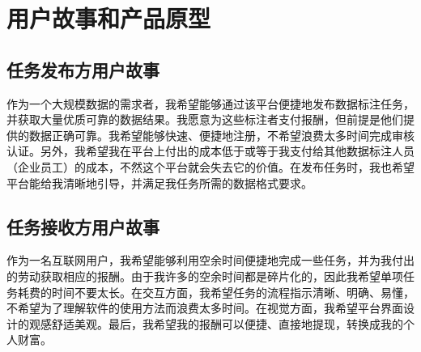 \section{用户故事和产品原型}

\subsection{任务发布方用户故事}

作为一个大规模数据的需求者，我希望能够通过该平台便捷地发布数据标注任务，并获取大量优质可靠的数据结果。我愿意为这些标注者支付报酬，但前提是他们提供的数据正确可靠。我希望能够快速、便捷地注册，不希望浪费太多时间完成审核认证。另外，我希望我在平台上付出的成本低于或等于我支付给其他数据标注人员（企业员工）的成本，不然这个平台就会失去它的价值。在发布任务时，我也希望平台能给我清晰地引导，并满足我任务所需的数据格式要求。

\subsection{任务接收方用户故事}

作为一名互联网用户，我希望能够利用空余时间便捷地完成一些任务，并为我付出的劳动获取相应的报酬。由于我许多的空余时间都是碎片化的，因此我希望单项任务耗费的时间不要太长。在交互方面，我希望任务的流程指示清晰、明确、易懂，不希望为了理解软件的使用方法而浪费太多时间。在视觉方面，我希望平台界面设计的观感舒适美观。最后，我希望我的报酬可以便捷、直接地提现，转换成我的个人财富。